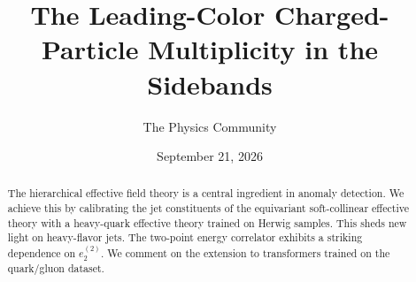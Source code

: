 \documentclass[11pt]{article}
\title{The Leading-Color Charged-Particle Multiplicity in the Sidebands}
\author{The Physics Community}
\date{September 21, 2026}
\numberwithin{equation}{section}
\theoremstyle{definition}
\theoremstyle{remark}
\begin{document}
\maketitle
\begin{abstract}
The hierarchical effective field theory is a central ingredient in
anomaly detection. We achieve this by calibrating the jet constituents
of the equivariant soft-collinear effective theory with a heavy-quark
effective theory trained on Herwig samples. This sheds new light on
heavy-flavor jets. The two-point energy correlator exhibits a striking
dependence on $e_2^{(2)}$. We comment on the extension to transformers
trained on the quark/gluon dataset.
\end{abstract}
\tableofcontents



\nocite{*}


\end{document}
